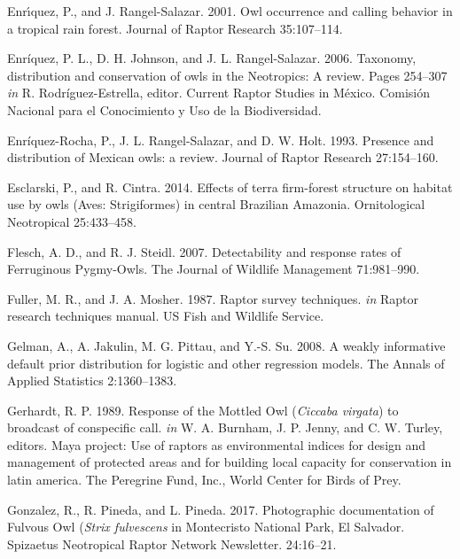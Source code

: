 \documentclass[
]{article}
\begin{document}
\leavevmode\hypertarget{ref-Enriquez:2001}{}%
Enrı́quez, P., and J. Rangel-Salazar. 2001. Owl occurrence and calling
behavior in a tropical rain forest. Journal of Raptor Research
35:107--114.

\leavevmode\hypertarget{ref-Enriquez:2006}{}%
Enríquez, P. L., D. H. Johnson, and J. L. Rangel-Salazar. 2006.
Taxonomy, distribution and conservation of owls in the Neotropics: A
review. Pages 254--307 \emph{in} R. Rodríguez-Estrella, editor. Current
Raptor Studies in México. Comisión Nacional para el Conocimiento y Uso
de la Biodiversidad.

\leavevmode\hypertarget{ref-Enriquez-Rocha:1993}{}%
Enríquez-Rocha, P., J. L. Rangel-Salazar, and D. W. Holt. 1993. Presence
and distribution of Mexican owls: a review. Journal of Raptor Research
27:154--160.

\leavevmode\hypertarget{ref-Esclarski:2014}{}%
Esclarski, P., and R. Cintra. 2014. Effects of terra firm-forest
structure on habitat use by owls (Aves: Strigiformes) in central
Brazilian Amazonia. Ornitological Neotropical 25:433--458.

\leavevmode\hypertarget{ref-Flesch:2007}{}%
Flesch, A. D., and R. J. Steidl. 2007. Detectability and response rates
of Ferruginous Pygmy-Owls. The Journal of Wildlife Management
71:981--990.

\leavevmode\hypertarget{ref-Fuller:1987}{}%
Fuller, M. R., and J. A. Mosher. 1987. Raptor survey techniques.
\emph{in} Raptor research techniques manual. US Fish and Wildlife
Service.

\leavevmode\hypertarget{ref-Gelman:2008}{}%
Gelman, A., A. Jakulin, M. G. Pittau, and Y.-S. Su. 2008. A weakly
informative default prior distribution for logistic and other regression
models. The Annals of Applied Statistics 2:1360--1383.

\leavevmode\hypertarget{ref-Gerhardt:1989}{}%
Gerhardt, R. P. 1989. Response of the Mottled Owl (\emph{Ciccaba
virgata}) to broadcast of conspecific call. \emph{in} W. A. Burnham, J.
P. Jenny, and C. W. Turley, editors. Maya project: Use of raptors as
environmental indices for design and management of protected areas and
for building local capacity for conservation in latin america. The
Peregrine Fund, Inc., World Center for Birds of Prey.

\leavevmode\hypertarget{ref-Gonzalez:2017}{}%
Gonzalez, R., R. Pineda, and L. Pineda. 2017. Photographic documentation
of Fulvous Owl (\emph{Strix fulvescens} in Montecristo National Park, El
Salvador. Spizaetus Neotropical Raptor Network Newsletter. 24:16--21.
\end{document}
